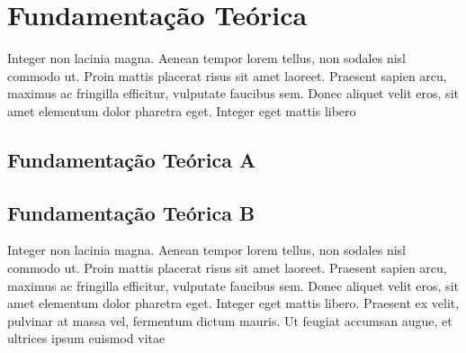 \chapter{Fundamentação Teórica}
\label{cap:fundamentacao-teorica}

Integer non lacinia magna. Aenean tempor lorem tellus, non sodales nisl commodo ut. Proin mattis placerat risus sit amet laoreet. Praesent sapien arcu, maximus ac fringilla efficitur, vulputate faucibus sem. Donec aliquet velit eros, sit amet elementum dolor pharetra eget. Integer eget mattis libero

\section{Fundamentação Teórica A}
\label{sec:fundamentacao-teorica-a}

\lipsum[10]

	\begin{figure}[h!]
		\centering
	\end{figure}
	
\lipsum[11]


\section{Fundamentação Teórica B}
\label{sec:fundamentacao-teorica-b}

Integer non lacinia magna. Aenean tempor lorem tellus, non sodales nisl commodo ut. Proin mattis placerat risus sit amet laoreet. Praesent sapien arcu, maximus ac fringilla efficitur, vulputate faucibus sem. Donec aliquet velit eros, sit amet elementum dolor pharetra eget. Integer eget mattis libero. Praesent ex velit, pulvinar at massa vel, fermentum dictum mauris. Ut feugiat accumsan augue, et ultrices ipsum euismod vitae


